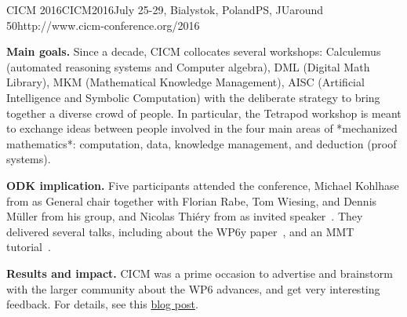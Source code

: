 \begin{event}{CICM 2016}{CICM2016}{July 25-29, Bialystok, Poland}{PS, JU}{around 50}{http://www.cicm-conference.org/2016}

\textbf{Main goals.} Since a decade, CICM collocates several workshops: Calculemus
(automated reasoning systems and Computer algebra), DML (Digital Math
Library), MKM (Mathematical Knowledge Management), AISC (Artificial
Intelligence and Symbolic Computation) with the deliberate strategy to
bring together a diverse crowd of people. In particular, the Tetrapod
workshop is meant to exchange ideas between people involved in the
four main areas of *mechanized mathematics*: computation, data,
knowledge management, and deduction (proof systems).

\textbf{ODK implication.} Five \ODK participants attended the conference, Michael Kohlhase
from  as General chair together with Florian Rabe, Tom Wiesing, and Dennis Müller
from his group, and Nicolas Thiéry from  as invited
speaker~\cite{Thierry:igcscac16}. They delivered several talks, including about the WP6y
paper~\cite{DehKohKon:iop16}, and an MMT tutorial~\cite{RabIanMue:ldm16,RabIanMue:adm16}.

\textbf{Results and impact.} CICM was a prime occasion to advertise
and brainstorm with the larger community about the WP6 advances, and
get very interesting feedback. For details, see this
\href{http://opendreamkit.org/activities/2016-08-01-CICM/}{blog post}.
\end{event}
